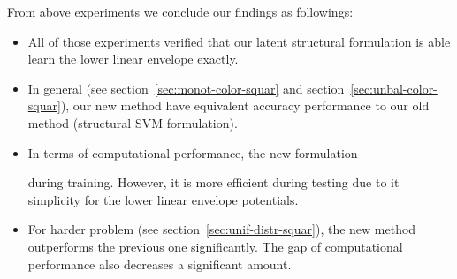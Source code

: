 From above experiments we conclude our findings as followings:

\begin{itemize}
\item All of those experiments verified that our latent
  structural formulation is able learn the lower linear envelope
  exactly.
\item In general (see section~\ref{sec:monot-color-squar} and
  section~\ref{sec:unbal-color-squar}), our new method have
  equivalent accuracy performance to our old method (structural
  SVM formulation\cite{Gould:ICML2011,gouldlearning}).
\item In terms of computational performance, the new formulation

  during training. However, it is more efficient during testing
  due to it simplicity for the lower linear envelope potentials.
\item For harder problem (see
  section~\ref{sec:unif-distr-squar}), the new method outperforms
  the previous one significantly. The gap of computational
  performance also decreases a significant amount.
\end{itemize}

